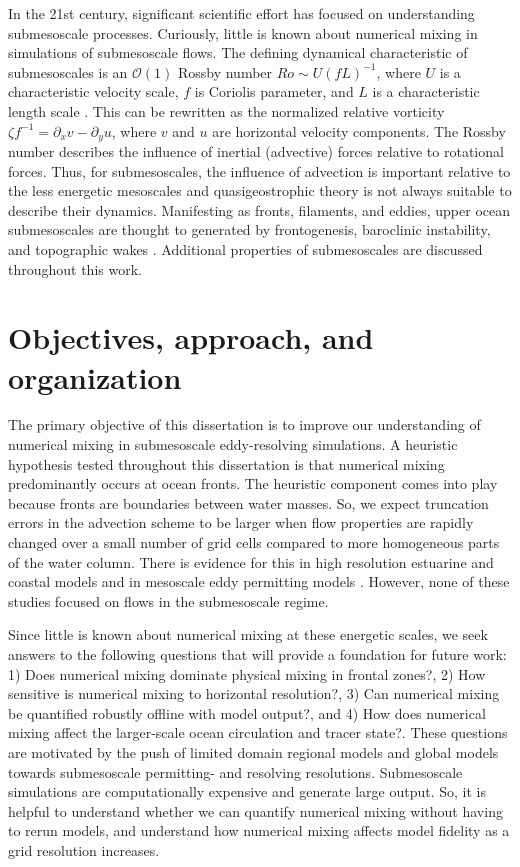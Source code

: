In the 21st century, significant scientific effort has focused on understanding submesoscale processes. Curiously, little is known about numerical mixing in simulations of submesoscale flows. The defining dynamical characteristic of submesoscales is an $\mathcal{O}(1)$ Rossby number $Ro \sim U(fL)^{-1}$, where $U$ is a characteristic velocity scale, $f$ is Coriolis parameter, and $L$ is a characteristic length scale \citep{McWilliams_2016,taylor2023submesoscale}. This can be rewritten as the normalized relative vorticity $\zeta f^{-1}= \partial_x v - \partial_y u$, where $v$ and $u$ are horizontal velocity components. The Rossby number describes the influence of inertial (advective) forces relative to rotational forces. Thus, for submesoscales, the influence of advection is important relative to the less energetic mesoscales and quasigeostrophic theory is not always suitable to describe their dynamics. Manifesting as fronts, filaments, and eddies, upper ocean submesoscales are thought to generated by frontogenesis, baroclinic instability, and topographic wakes \citep{mcwilliams2019survey, taylor2023submesoscale}. Additional properties of submesoscales are discussed throughout this work. 

\section{Objectives, approach, and organization} \label{sec:diss_obj}
The primary objective of this dissertation is to improve our understanding of numerical mixing in submesoscale eddy-resolving simulations. A heuristic hypothesis tested throughout this dissertation is that numerical mixing predominantly occurs at ocean fronts. The heuristic component comes into play because fronts are boundaries between water masses. So, we expect truncation errors in the advection scheme to be larger when flow properties are rapidly changed over a small number of grid cells compared to more homogeneous parts of the water column. There is evidence for this in high resolution estuarine and coastal models \citep{Broatch_2022, Kalra_2019, Ralston_2017, wang2021structure} and in mesoscale eddy permitting models \citep{Holmes_2021, megann2022assessment}. However, none of these studies focused on flows in the submesoscale regime.

Since little is known about numerical mixing at these energetic scales, we seek answers to the following questions that will provide a foundation for future work: 1) Does numerical mixing dominate physical mixing in frontal zones?, 2) How sensitive is numerical mixing to horizontal resolution?, 3) Can numerical mixing be quantified robustly offline with model output?, and 4) How does numerical mixing affect the larger-scale ocean circulation and tracer state?. These questions are motivated by the push of limited domain regional models and global models towards submesoscale permitting- and resolving resolutions. Submesoscale simulations are computationally expensive and generate large output. So, it is helpful to understand whether we can quantify numerical mixing without having to rerun models, and understand how numerical mixing affects model fidelity as a grid resolution increases.

